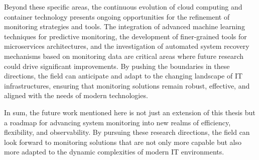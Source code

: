 Beyond these specific areas, the continuous evolution of cloud computing and container technology presents ongoing opportunities for the refinement of monitoring strategies and tools. The integration of advanced machine learning techniques for predictive monitoring, the development of finer-grained tools for microservices architectures, and the investigation of automated system recovery mechanisms based on monitoring data are critical areas where future research could drive significant improvements. By pushing the boundaries in these directions, the field can anticipate and adapt to the changing landscape of IT infrastructures, ensuring that monitoring solutions remain robust, effective, and aligned with the needs of modern technologies. 

In sum, the future work mentioned here is not just an extension of this thesis but a roadmap for advancing system monitoring into new realms of efficiency, flexibility, and observability. By pursuing these research directions, the field can look forward to monitoring solutions that are not only more capable but also more adapted to the dynamic complexities of modern IT environments. 